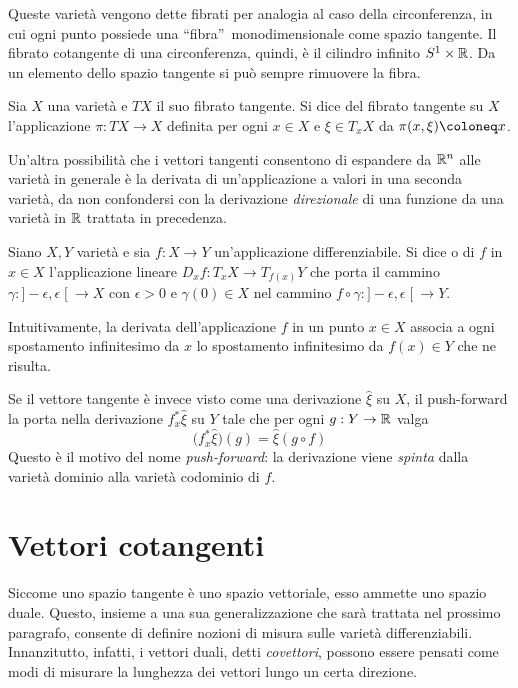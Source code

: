 Queste varietà vengono dette fibrati per analogia al caso della circonferenza, in cui ogni punto possiede una \textquotedblleft fibra\textquotedblright\ monodimensionale come spazio tangente. Il fibrato cotangente di una circonferenza, quindi, è il cilindro infinito $S^1 \times \mathbb{R}$. Da un elemento dello spazio tangente si può sempre rimuovere la fibra.
\begin{definition}
  Sia $X$ una varietà e $T X$ il suo fibrato tangente. Si dice  del fibrato tangente su $X$ l'applicazione $\pi: TX \to X$ definita per ogni $x \in X$ e $\xi \in T_x X$ da $\pi(x,\xi) \defeq x$.
\end{definition}

Un'altra possibilità che i vettori tangenti consentono di espandere da $\mathbb{R}^{n}$ alle varietà in generale è la derivata di un'applicazione a valori in una seconda varietà, da non confondersi con la derivazione \emph{direzionale} di una funzione da una varietà in $\mathbb{R}$ trattata in precedenza.
\begin{definition}
  Siano $X,Y$ varietà e sia $f:X\to Y$ un'applicazione differenziabile. Si dice  o  di $f$ in $x \in X$ l'applicazione lineare $D_x f:T_x X \to T_{f(x)}Y$ che porta il cammino $\gamma: ]-\epsilon, \epsilon\;[\ \to X$ con $\epsilon>0$ e $\gamma(0) \in X$ nel cammino $f \circ \gamma:]-\epsilon, \epsilon\;[\ \to Y$.
\end{definition}
\begin{remark}
  Intuitivamente, la derivata dell'applicazione $f$ in un punto $x \in X$ associa a ogni spostamento infinitesimo da $x$ lo spostamento infinitesimo da $f(x) \in Y$ che ne risulta.
\end{remark}
\begin{remark}
  Se il vettore tangente è invece visto come una derivazione $\hat{\xi}$ su $X$, il push-forward la porta nella derivazione $f^*_x \hat{\xi}$ su $Y$ tale che per ogni $g:Y\to \mathbb{R}$ valga
  \begin{equation}
    \big(f^*_x \hat{\xi}\big)(g) = \hat{\xi} (g \circ f) 
  \end{equation} 
  Questo è il motivo del nome \emph{push-forward}: la derivazione viene \emph{spinta} dalla varietà dominio alla varietà codominio di $f$. 
\end{remark}

\section{Vettori cotangenti}
Siccome uno spazio tangente è uno spazio vettoriale, esso ammette uno spazio duale. Questo, insieme a una sua generalizzazione che sarà trattata nel prossimo paragrafo, consente di definire nozioni di misura sulle varietà differenziabili. Innanzitutto, infatti, i vettori duali, detti \emph{covettori}, possono essere pensati come modi di misurare la lunghezza dei vettori lungo un certa direzione.

